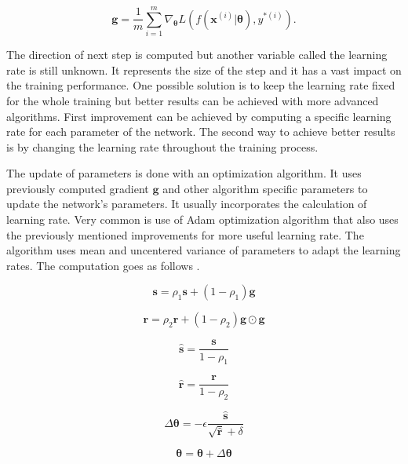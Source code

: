 \begin{equation}
    \label{eq:sgd}
    \pmb g = \frac{1}{m} \sum\limits_{i=1}^{m} \nabla_{\pmb \theta} L(f(\pmb {x}^{(i)}| \pmb \theta), {y}^{*(i)}).
\end{equation}

The direction of next step is computed but another variable called the learning rate is still unknown. It represents the size of the step and it has a vast impact on the training performance. One possible solution is to keep the learning rate fixed for the whole training but better results can be achieved with more advanced algorithms. First improvement can be achieved by computing a specific learning rate for each parameter of the network. The second way to achieve better results is by changing the learning rate throughout the training process.

The update of parameters is done with an optimization algorithm. It uses previously computed gradient $\pmb g$ and other algorithm specific parameters to update the network's parameters. It usually incorporates the calculation of learning rate. Very common is use of Adam optimization algorithm that also uses the previously mentioned improvements for more useful learning rate. The algorithm uses mean and uncentered variance of parameters to adapt the learning rates. The computation goes as follows \cite{kingma2017adam}.

\begin{equation}
    \pmb s = \rho_1 \pmb s + (1 - \rho_1) \pmb g
\end{equation}

\begin{equation}
    \pmb r = \rho_2 \pmb r + (1 - \rho_2) \pmb g \odot \pmb g
\end{equation}

\begin{equation}
    \hat{\pmb s} = \frac{\pmb s}{1 - \rho_1}
\end{equation}

\begin{equation}
    \hat{\pmb r} = \frac{\pmb r}{1 - \rho_2}
\end{equation}

\begin{equation}
    \Delta \pmb \theta = - \epsilon \frac{\hat{\pmb s}}{\sqrt{\hat{\pmb r}} + \delta}
\end{equation}

\begin{equation}
    \pmb \theta = \pmb \theta + \Delta \pmb \theta
\end{equation}

